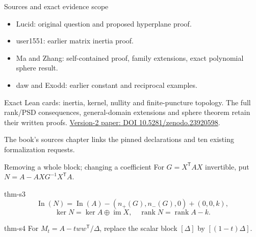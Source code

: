 \documentclass{beamer}
\begin{document}
\begin{frame}{Sources and exact evidence scope}
\begin{itemize}
\item Lucid: original question and proposed hyperplane proof.
\item user1551: earlier matrix inertia proof.
\item Ma and Zhang: self-contained proof, family extensions, exact polynomial sphere result.
\item daw and Exodd: earlier constant and reciprocal examples.
\end{itemize}
Exact Lean cards: inertia, kernel, nullity and finite-puncture topology. The full rank/PSD consequences, general-domain extensions and sphere theorem retain their written proofs.
\medskip
\href{https://doi.org/10.5281/zenodo.23920598}{Version-2 paper: DOI 10.5281/zenodo.23920598}.\par
The book's sources chapter links the pinned declarations and ten existing formalization requests.
\end{frame}
\appendix
\begin{frame}{Removing a whole block; changing a coefficient}
For $G=X^{\mathsf T}AX$ invertible, put $N=A-AXG^{-1}X^{\mathsf T}A$.
\begin{bookresult}{thm-s3}
\[
\operatorname{In}(N)=\operatorname{In}(A)-(n_+(G),n_-(G),0)+(0,0,k),
\]
\[
\ker N=\ker A\oplus\operatorname{im}X,\quad \operatorname{rank}N=\operatorname{rank}A-k.
\]
\end{bookresult}
\begin{bookresult}{thm-s4}
For $M_t=A-tww^{\mathsf T}/\Delta$, replace the scalar block $[\Delta]$ by $[(1-t)\Delta]$.
\end{bookresult}
\end{frame}
\FormalVerification
\end{document}
